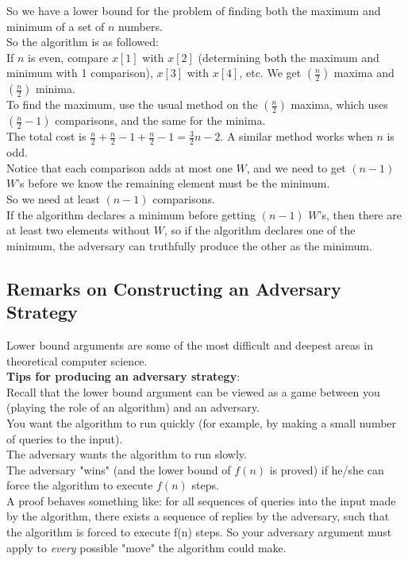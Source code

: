 \documentclass[12pt]{article}
\theoremstyle{plain}
\theoremstyle{definition}
\begin{document}
So we have a lower bound for the problem of finding both the maximum and minimum of a set of $n$ numbers. \\

So the algorithm is as followed: \\
If $n$ is even, compare $x[1]$ with $x[2]$ (determining both the maximum and minimum with 1 comparison), $x[3]$ with $x[4]$, etc.
We get $(\frac{n}{2})$ maxima and $(\frac{n}{2})$ minima. \\
To find the maximum, use the usual method on the $(\frac{n}{2})$ maxima, which uses $(\frac{n}{2} - 1)$ comparisons, and the same for the minima. \\
The total cost is $\frac{n}{2} + \frac{n}{2} - 1 + \frac{n}{2} - 1 = \frac{3}{2}n - 2$.
A similar method works when $n$ is odd. \\

Notice that each comparison adds at most one $W$, and we need to get $(n - 1)$ $W$'s before we know the remaining element must be the minimum. \\
So we need at least $(n - 1)$ comparisons. \\
If the algorithm declares a minimum before getting $(n - 1)$ $W$'s, then there are at least two elements without $W$, so if the algorithm declares one of the minimum, the adversary can truthfully produce the other as the minimum.

\subsection{Remarks on Constructing an Adversary Strategy}
Lower bound arguments are some of the most difficult and deepest areas in theoretical computer science. \\

\textbf{Tips for producing an adversary strategy}: \\

Recall that the lower bound argument can be viewed as a game between you (playing the role of an algorithm) and an adversary. \\
You want the algorithm to run quickly (for example, by making a small number of queries to the input). \\
The adversary wants the algorithm to run slowly. \\
The adversary "wins" (and the lower bound of $f(n)$ is proved) if he/she can force the algorithm to execute $f(n)$ steps. \\

A proof behaves something like: for all sequences of queries into the input made by the algorithm, there exists a sequence of replies by the adversary, such that the algorithm is forced to execute f(n) steps.
So your adversary argument must apply to \emph{every} possible "move" the algorithm could make. \\
\end{document}
